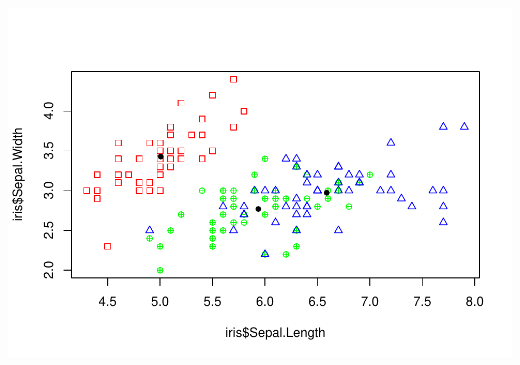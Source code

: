 \documentclass[
]{book}
\begin{document}
\includegraphics{_main_files/figure-latex/unnamed-chunk-191-1.pdf}
\end{document}
